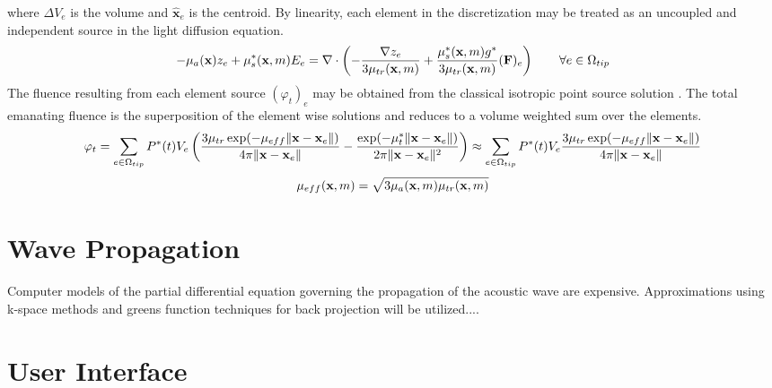 \documentclass{article}         %
\theoremstyle{definition}
\theoremstyle{remark}
\begin{document}
where $\Delta V_e$ is the volume and 
$\hat{\textbf{x}}_e$ is the centroid.
By linearity, each element in the discretization may be treated as
an uncoupled and independent source in the light diffusion equation.
\[
 -{\color{black}\mu_a(\textbf{x})} z_e 
 +{\color{black}\mu_s^*(\textbf{x},m)} E_e
 = \nabla \cdot 
   \left( 
   - \frac{ \nabla z_e }{3\mu_{tr}(\textbf{x},m)} 
   + \frac{ {\color{black}\mu_s^*}(\textbf{x},m) g^* }{3\mu_{tr}(\textbf{x},m)} 
       (\textbf{F})_e
   \right) \qquad \forall e \in \Omega_{tip}
\]
The fluence resulting from each element source $(\varphi_t)_e$
may be obtained from the classical isotropic point source
solution \cite{Welch95}.
The total emanating fluence is the superposition of the element wise
solutions and reduces to a volume weighted sum over the elements.
\[
   \varphi_t = \sum_{e \in \Omega_{tip}}
 {\color{black}P^*(t)}  V_e  \left(
   \frac{3\mu_{tr} \exp(-\mu_{eff} \|\textbf{x} -{\color{black}\textbf{x}_e}\|) }
      {4\pi \|\textbf{x}-{\color{black}\textbf{x}_e}\|}
 - 
      \frac{ 
             \exp(-\mu_t^* \|\textbf{x} -{\color{black}\textbf{x}_e}\|) }
           {2\pi \|\textbf{x}-{\color{black}\textbf{x}_e}\|^2}
   \right)
\approx
    \sum_{e \in \Omega_{tip}}
 {\color{black}P^*(t)}  V_e 
   \frac{3\mu_{tr} \exp(-\mu_{eff} \|\textbf{x} -{\color{black}\textbf{x}_e}\|) }
      {4\pi \|\textbf{x}-{\color{black}\textbf{x}_e}\|}
\]
\[
 \mu_{eff}(\textbf{x},m)  = 
           \sqrt{ 3 {\color{black}\mu_a(\textbf{x},m)} \mu_{tr}(\textbf{x},m) }
\]


\section{Wave Propagation}\label{WavePropagation}

Computer models of the partial differential equation governing the
propagation of the acoustic wave are expensive. Approximations using k-space
methods and greens function techniques for back projection will be
utilized....

\section{User Interface}\label{UserInterface}
\end{document}

